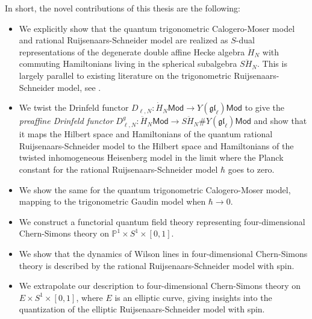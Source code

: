 \documentclass[11pt]{report}
\theoremstyle{definition}
\theoremstyle{remark}
\theoremstyle{remark}
\renewcommand{\P}{\mathbb{P}}
\begin{document}
In short, the novel contributions of this thesis are the following:
\begin{itemize}
\item We explicitly show that the quantum trigonometric Calogero-Moser model and rational Ruijsenaars-Schneider model are realized as $S$-dual representations of the degenerate double affine Hecke algebra $\ddot H_N$ with commuting Hamiltonians living in the spherical subalgebra $S\ddot H_N$. This is largely parallel to existing literature on the trigonometric Ruijsenaars-Schneider model, see \cite{article:lamers:2022}.
\item We twist the Drinfeld functor $D_{\ell,N}: \dot H_N \mathsf{Mod} \to Y(\mathfrak{gl}_\ell) \mathsf{Mod}$ to give the \emph{preaffine Drinfeld functor} $D_{\ell,N}^g: \ddot H_N \mathsf{Mod} \to S\ddot H_N \# Y(\mathfrak{gl}_\ell) \mathsf{Mod}$ and show that it maps the Hilbert space and Hamiltonians of the quantum rational Ruijsenaars-Schneider model to the Hilbert space and Hamiltonians of the twisted inhomogeneous Heisenberg model in the limit where the Planck constant for the rational Ruijsenaars-Schneider model $\hbar$ goes to zero.
\item We show the same for the quantum trigonometric Calogero-Moser model, mapping to the trigonometric Gaudin model when $\hbar \to 0$.
\item We construct a functorial quantum field theory representing four-dimensional Chern-Simons theory on $\P^1 \times S^1 \times [0,1]$.
\item We show that the dynamics of Wilson lines in four-dimensional Chern-Simons theory is described by the rational Ruijsenaars-Schneider model with spin.
\item We extrapolate our description to four-dimensional Chern-Simons theory on $E \times S^1 \times [0,1]$, where $E$ is an elliptic curve, giving insights into the quantization of the elliptic Ruijsenaars-Schneider model with spin.
\end{itemize}
\end{document}
